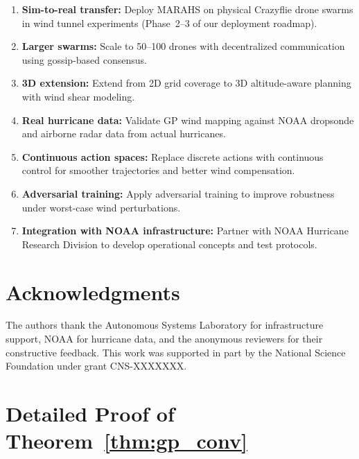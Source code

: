 \documentclass[12pt,a4paper,twocolumn]{article}
\begin{document}
\begin{enumerate}[leftmargin=*]
\begin{enumerate}[leftmargin=*]
    \item \textbf{Sim-to-real transfer:} Deploy MARAHS on physical Crazyflie drone swarms in wind tunnel experiments (Phase~2--3 of our deployment roadmap).
    \item \textbf{Larger swarms:} Scale to 50--100 drones with decentralized communication using gossip-based consensus.
    \item \textbf{3D extension:} Extend from 2D grid coverage to 3D altitude-aware planning with wind shear modeling.
    \item \textbf{Real hurricane data:} Validate GP wind mapping against NOAA dropsonde and airborne radar data from actual hurricanes.
    \item \textbf{Continuous action spaces:} Replace discrete actions with continuous control for smoother trajectories and better wind compensation.
    \item \textbf{Adversarial training:} Apply adversarial training to improve robustness under worst-case wind perturbations.
    \item \textbf{Integration with NOAA infrastructure:} Partner with NOAA Hurricane Research Division to develop operational concepts and test protocols.
\end{enumerate}


\section*{Acknowledgments}
The authors thank the Autonomous Systems Laboratory for infrastructure support, NOAA for hurricane data, and the anonymous reviewers for their constructive feedback. This work was supported in part by the National Science Foundation under grant CNS-XXXXXXX.






\appendix
\section{Detailed Proof of Theorem~\ref{thm:gp_conv}}
\label{app:gp_proof}


\end{enumerate}
\end{document}
